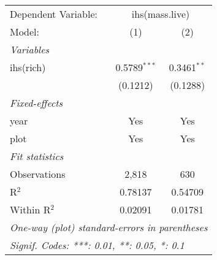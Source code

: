 \begin{tabular}{lcc}
\tabularnewline\midrule\midrule
Dependent Variable:&\multicolumn{2}{c}{ihs(mass.live)}\\
Model:&(1) & (2)\\
\midrule \emph{Variables}&   &  \\
ihs(rich)&0.5789$^{***}$ & 0.3461$^{**}$\\
  &(0.1212) & (0.1288)\\
\midrule \emph{Fixed-effects}&   &  \\
year & Yes & Yes\\
plot & Yes & Yes\\
\midrule \emph{Fit statistics}&  & \\
Observations & 2,818&630\\
R$^2$ & 0.78137&0.54709\\
Within R$^2$ & 0.02091&0.01781\\
\midrule\midrule\multicolumn{3}{l}{\emph{One-way (plot) standard-errors in parentheses}}\\
\multicolumn{3}{l}{\emph{Signif. Codes: ***: 0.01, **: 0.05, *: 0.1}}\\
\end{tabular}


